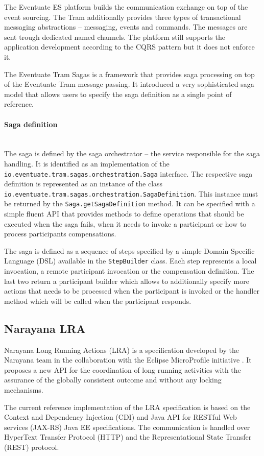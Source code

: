 \documentclass[oneside,
  digital, %
  table,   %
  lof,     %
  lot,     %
]{fithesis3}
\newcommand{\newlinepar}[1]{\paragraph{#1}\needspace{4\baselineskip}\mbox{}\\}
\begin{document}
The Eventuate ES platform builds the communication exchange on top of the event sourcing. The Tram additionally provides three types of transactional messaging abstractions -- messaging, events and commands. The messages are sent trough dedicated named channels. The platform still supports the application development according to the CQRS pattern but it does not enforce it.

The Eventuate Tram Sagas is a framework that provides saga processing on top of the Eventuate Tram message passing. It introduced a very sophisticated saga model that allows users to specify the saga definition as a single point of reference. 

\newlinepar{Saga definition}

The saga is defined by the saga orchestrator -- the service responsible for the saga handling. It is identified as an implementation of the \texttt{io.eventuate.tram.sagas.orchestration.Saga} interface. The respective saga definition is represented as an instance of the class \texttt{io.eventuate.tram.sagas.orchestration.SagaDefinition}. This instance must be returned by the \texttt{Saga.getSagaDefinition} method. It can be specified with a simple fluent API that provides methods to define operations that should be executed when the saga fails, when it needs to invoke a participant or how to process participants compensations. 

The saga is defined as a sequence of steps specified by a simple Domain Specific Language (DSL) available in the \texttt{StepBuilder} class. Each step represents a local invocation, a remote participant invocation or the compensation definition. The last two return a participant builder which allows to additionally specify more actions that needs to be processed when the participant is invoked or the handler method which will be called when the participant responds.

\subsection{Narayana LRA}

Narayana Long Running Actions (LRA) is a specification developed by the Narayana team in the collaboration with the Eclipse MicroProfile initiative \cite{saga-impl-comp}. It proposes a new API for the coordination of long running activities with the assurance of the globally consistent outcome and without any locking mechanisms.

The current reference implementation of the LRA specification is based on the Context and Dependency Injection (CDI) and Java API for RESTful Web services (JAX-RS) Java EE specifications. The communication is handled over HyperText Transfer Protocol (HTTP) and the Representational State Transfer (REST) protocol.
\end{document}
